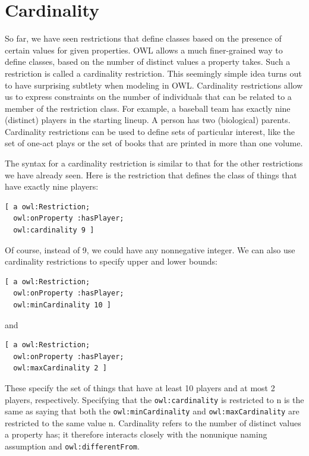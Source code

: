 \section{Cardinality}

So far, we have seen restrictions that define classes based on the
presence of certain values for given properties. OWL allows a much
finer-grained way to define classes, based on the number of distinct
values a property takes. Such a restriction is called a cardinality
restriction. This seemingly simple idea turns out to have surprising
subtlety when modeling in OWL. Cardinality restrictions allow us to
express constraints on the number of individuals that can be related to
a member of the restriction class. For example, a baseball team has
exactly nine (distinct) players in the starting lineup. A person has two (biological) parents.
Cardinality restrictions can be used to define sets of particular
interest, like the set of one-act plays or the set of books that are
printed in more than one volume.

The syntax for a cardinality restriction is similar to that for the
other restrictions we have already
seen. Here is the restriction that defines the class of things that have
exactly nine players:

\begin{lstlisting}
[ a owl:Restriction;
  owl:onProperty :hasPlayer;
  owl:cardinality 9 ]
\end{lstlisting}

Of course, instead of 9, we could have any nonnegative integer. We can
also use cardinality restrictions to specify upper and lower bounds:

\begin{lstlisting}
[ a owl:Restriction;
  owl:onProperty :hasPlayer;
  owl:minCardinality 10 ]
\end{lstlisting}

and

\begin{lstlisting}
[ a owl:Restriction;
  owl:onProperty :hasPlayer;
  owl:maxCardinality 2 ]
\end{lstlisting}

These specify the set of things that have at least 10 players and at
most 2 players, respectively. Specifying that the \texttt{owl:cardinality} is
restricted to n is the same as saying that both the \texttt{owl:minCardinality}
and \texttt{owl:maxCardinality} are restricted to the same value n. Cardinality
refers to the number of distinct values a property has; it therefore
interacts closely with the nonunique naming assumption and
\texttt{owl:differentFrom}.

